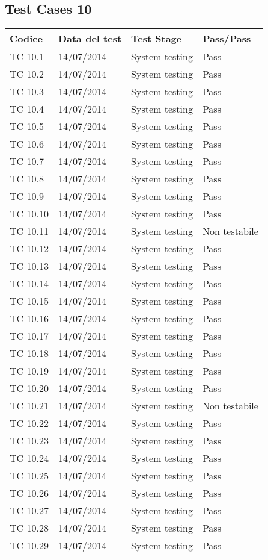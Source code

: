 \subsection{Test Cases 10}

\begin{longtable}{|p{3cm}|p{3cm}|p{3cm}|p{3cm}|}
	\hline
	\rowcolor{Gray}
	\textbf{Codice} & \textbf{Data del test} & \textbf{Test Stage} & \textbf{Pass/Pass}\tabularnewline
	\hline
	TC 10.1			& 14/07/2014 			& System testing		& Pass \tabularnewline
	\hline
	TC 10.2			& 14/07/2014 			& System testing		& Pass \tabularnewline
	\hline
	TC 10.3			& 14/07/2014 			& System testing		& Pass \tabularnewline
	\hline
	TC 10.4			& 14/07/2014 			& System testing		& Pass \tabularnewline
	\hline
	TC 10.5			& 14/07/2014 			& System testing		& Pass \tabularnewline
	\hline
	TC 10.6			& 14/07/2014 			& System testing		& Pass \tabularnewline
	\hline
	TC 10.7			& 14/07/2014 			& System testing		& Pass \tabularnewline
	\hline
	TC 10.8			& 14/07/2014 			& System testing		& Pass \tabularnewline
	\hline
	TC 10.9			& 14/07/2014 			& System testing		& Pass \tabularnewline
	\hline
	TC 10.10		& 14/07/2014 			& System testing		& Pass \tabularnewline
	\hline
	TC 10.11		& 14/07/2014 			& System testing		& Non testabile \tabularnewline
	\hline
	TC 10.12		& 14/07/2014 			& System testing		& Pass \tabularnewline
	\hline
	TC 10.13		& 14/07/2014 			& System testing		& Pass \tabularnewline
	\hline
	TC 10.14		& 14/07/2014 			& System testing		& Pass \tabularnewline
	\hline
	TC 10.15		& 14/07/2014 			& System testing		& Pass \tabularnewline
	\hline
	TC 10.16		& 14/07/2014 			& System testing		& Pass \tabularnewline
	\hline
	TC 10.17		& 14/07/2014 			& System testing		& Pass \tabularnewline
	\hline
	TC 10.18		& 14/07/2014 			& System testing		& Pass \tabularnewline
	\hline
	TC 10.19		& 14/07/2014 			& System testing		& Pass \tabularnewline
	\hline
	TC 10.20		& 14/07/2014 			& System testing		& Pass \tabularnewline
	\hline
	TC 10.21		& 14/07/2014 			& System testing		& Non testabile \tabularnewline
	\hline
	TC 10.22		& 14/07/2014 			& System testing		& Pass \tabularnewline
	\hline
	TC 10.23		& 14/07/2014 			& System testing		& Pass \tabularnewline
	\hline
	TC 10.24		& 14/07/2014 			& System testing		& Pass \tabularnewline
	\hline
	TC 10.25		& 14/07/2014 			& System testing		& Pass \tabularnewline
	\hline
	TC 10.26		& 14/07/2014 			& System testing		& Pass \tabularnewline
	\hline
	TC 10.27		& 14/07/2014 			& System testing		& Pass \tabularnewline
	\hline
	TC 10.28		& 14/07/2014 			& System testing		& Pass \tabularnewline
	\hline
	TC 10.29		& 14/07/2014 			& System testing		& Pass \tabularnewline

\end{longtable}
